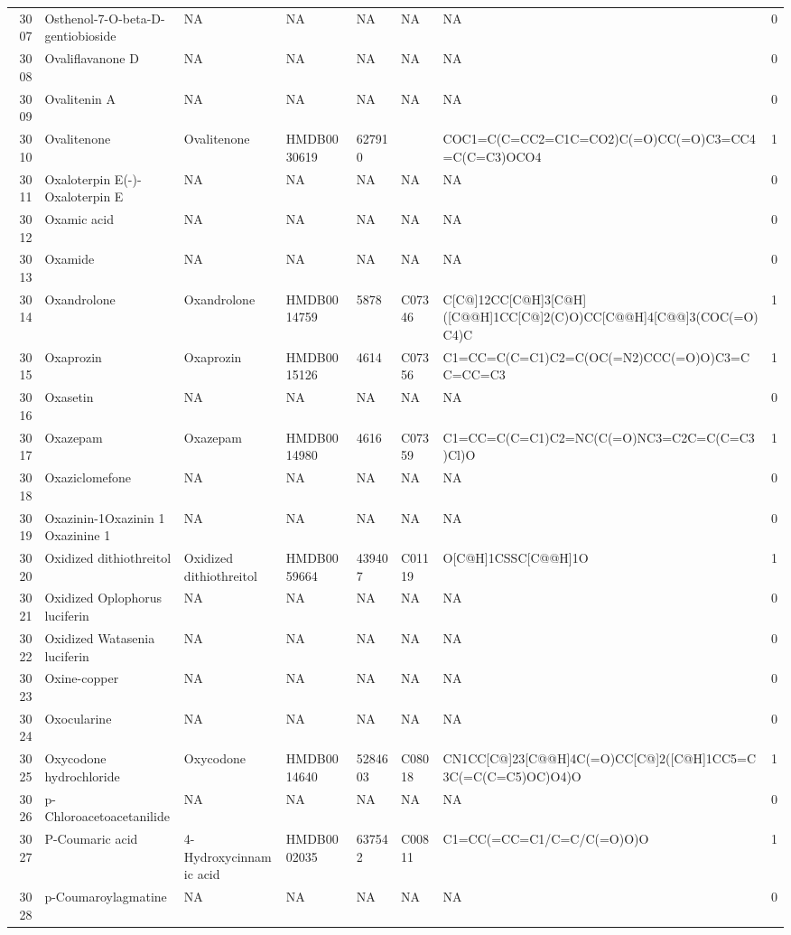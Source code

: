 \documentclass[a4paper]{article}
\begin{document}
\begin{longtable}{rlllllll}
  3007 & Osthenol-7-O-beta-D-gentiobioside & NA & NA & NA & NA & NA & 0 \\ 
  3008 & Ovaliflavanone D & NA & NA & NA & NA & NA & 0 \\ 
  3009 & Ovalitenin A & NA & NA & NA & NA & NA & 0 \\ 
  3010 & Ovalitenone & Ovalitenone & HMDB0030619 & 627910 &  & COC1=C(C=CC2=C1C=CO2)C(=O)CC(=O)C3=CC4=C(C=C3)OCO4 & 1 \\ 
  3011 & Oxaloterpin E(-)-Oxaloterpin E & NA & NA & NA & NA & NA & 0 \\ 
  3012 & Oxamic acid & NA & NA & NA & NA & NA & 0 \\ 
  3013 & Oxamide & NA & NA & NA & NA & NA & 0 \\ 
  3014 & Oxandrolone & Oxandrolone & HMDB0014759 & 5878 & C07346 & C[C@]12CC[C@H]3[C@H]([C@@H]1CC[C@]2(C)O)CC[C@@H]4[C@@]3(COC(=O)C4)C & 1 \\ 
  3015 & Oxaprozin & Oxaprozin & HMDB0015126 & 4614 & C07356 & C1=CC=C(C=C1)C2=C(OC(=N2)CCC(=O)O)C3=CC=CC=C3 & 1 \\ 
  3016 & Oxasetin & NA & NA & NA & NA & NA & 0 \\ 
  3017 & Oxazepam & Oxazepam & HMDB0014980 & 4616 & C07359 & C1=CC=C(C=C1)C2=NC(C(=O)NC3=C2C=C(C=C3)Cl)O & 1 \\ 
  3018 & Oxaziclomefone & NA & NA & NA & NA & NA & 0 \\ 
  3019 & Oxazinin-1Oxazinin 1 Oxazinine 1 & NA & NA & NA & NA & NA & 0 \\ 
  3020 & Oxidized dithiothreitol & Oxidized dithiothreitol & HMDB0059664 & 439407 & C01119 & O[C@H]1CSSC[C@@H]1O & 1 \\ 
  3021 & Oxidized Oplophorus luciferin & NA & NA & NA & NA & NA & 0 \\ 
  3022 & Oxidized Watasenia luciferin & NA & NA & NA & NA & NA & 0 \\ 
  3023 & Oxine-copper & NA & NA & NA & NA & NA & 0 \\ 
  3024 & Oxocularine & NA & NA & NA & NA & NA & 0 \\ 
  3025 & Oxycodone hydrochloride & Oxycodone & HMDB0014640 & 5284603 & C08018 & CN1CC[C@]23[C@@H]4C(=O)CC[C@]2([C@H]1CC5=C3C(=C(C=C5)OC)O4)O & 1 \\ 
  3026 & p-Chloroacetoacetanilide & NA & NA & NA & NA & NA & 0 \\ 
  3027 & P-Coumaric acid & 4-Hydroxycinnamic acid & HMDB0002035 & 637542 & C00811 & C1=CC(=CC=C1/C=C/C(=O)O)O & 1 \\ 
  3028 & p-Coumaroylagmatine & NA & NA & NA & NA & NA & 0 \\ 

\end{longtable}
\end{document}
